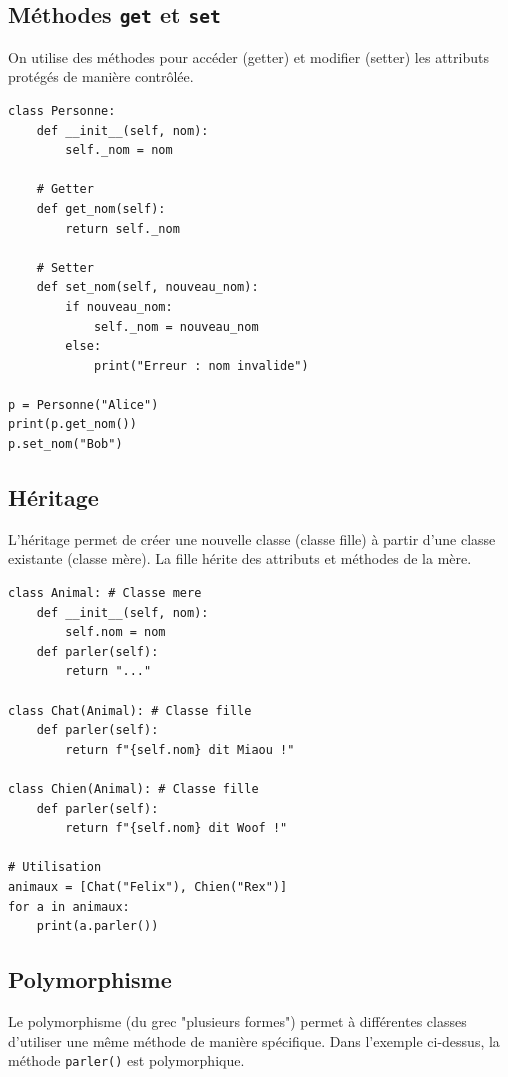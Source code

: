\documentclass[a4paper,12pt]{article}
\begin{document}
\subsection{Méthodes \texttt{get} et \texttt{set}}
On utilise des méthodes pour accéder (getter) et modifier (setter) les attributs protégés de manière contrôlée.
\begin{lstlisting}
class Personne:
    def __init__(self, nom):
        self._nom = nom

    # Getter
    def get_nom(self):
        return self._nom

    # Setter
    def set_nom(self, nouveau_nom):
        if nouveau_nom:
            self._nom = nouveau_nom
        else:
            print("Erreur : nom invalide")

p = Personne("Alice")
print(p.get_nom())
p.set_nom("Bob")
\end{lstlisting}

\subsection{Héritage}
L'héritage permet de créer une nouvelle classe (classe fille) à partir d'une classe existante (classe mère). La fille hérite des attributs et méthodes de la mère.
\begin{lstlisting}
class Animal: # Classe mere
    def __init__(self, nom):
        self.nom = nom
    def parler(self):
        return "..."

class Chat(Animal): # Classe fille
    def parler(self):
        return f"{self.nom} dit Miaou !"

class Chien(Animal): # Classe fille
    def parler(self):
        return f"{self.nom} dit Woof !"

# Utilisation
animaux = [Chat("Felix"), Chien("Rex")]
for a in animaux:
    print(a.parler())
\end{lstlisting}

\subsection{Polymorphisme}
Le polymorphisme (du grec "plusieurs formes") permet à différentes classes d'utiliser une même méthode de manière spécifique. Dans l'exemple ci-dessus, la méthode \texttt{parler()} est polymorphique.
\end{document}
